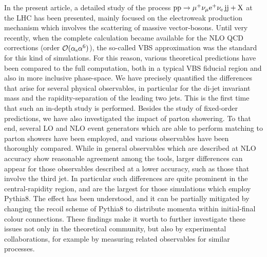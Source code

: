 In the present article, a detailed study of the process $\text{p}\text{p}\to\mu^+\nu_\mu{\rm e}^+\nu_{\rm e}\,\text{j}\text{j}+\mathrm{X}$ at the LHC has been presented, 
mainly focused on the electroweak production mechanism which involves the scattering of massive vector-bosons.
Until very recently, when the complete calculation became available for the NLO QCD corrections (order $\mathcal O (\alpha_\text{s}\alpha^6)$),
the so-called VBS approximation was the standard for this kind of simulations. For this reason, various theoretical predictions 
have been compared to the full computation, both in a typical VBS fiducial region and also in more inclusive phase-space.
We have precisely quantified the differences that arise for several physical observables, 
in particular for the di-jet invariant mass and the rapidity-separation of the leading two jets.
This is the first time that such an in-depth study is performed.
Besides the study of fixed-order predictions, we have also investigated the impact of parton showering.
To that end, several LO and NLO event generators 
which are able to perform matching to parton showers have been employed, and various observables have been thoroughly compared.
While in general observables which are described at NLO accuracy show reasonable agreement among the tools, larger differences can 
appear for those observables described at a lower accuracy, such as those that involve the third jet.
In particular such differences are quite prominent in the central-rapidity region, and are the largest for those simulations which employ {\sc Pythia8}.
The effect
has been understood, and it can be partially mitigated by changing the recoil scheme of {\sc Pythia8} to distribute momenta within initial-final colour connections. These findings make it worth 
to further investigate these issues not only in the theoretical community, but also by experimental collaborations, for example by 
measuring related observables for similar processes.

